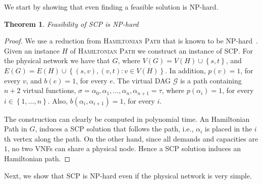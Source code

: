 \documentclass[11pt]{article}
\newtheorem{theorem}{Theorem}
\newcommand{\set}[1]{\left\{ #1 \right\}}
\newcommand{\scp}{\textsc{SCP}\xspace}
\newcommand{\calG}{\mathcal{G}}
\begin{document}
We start by showing that even finding a feasible solution is NP-hard.

\begin{theorem}
Feasibility of \scp is NP-hard
\end{theorem}
\begin{proof}
We use a reduction from \textsc{Hamiltonian Path} that is known to be
NP-hard~\cite{GarJoh79}.
%
Given an instance $H$ of \textsc{Hamiltonian Path} we construct an
instance of \scp.  For the physical network we have that $G$, where
$V(G) = V(H) \cup \set{s,t}$, and $E(G) = E(H) \cup \set{(s,v),(v,t) :
  v \in V(H)}$.  In addition, $p(v) = 1$, for every $v$, and $b(e) =
1$, for every $e$.  The virtual DAG $\calG$ is a path containing $n+2$
virtual functions, $\sigma = \alpha_0, \alpha_1, \ldots, \alpha_n,
\alpha_{n+1} = \tau$, where $p(\alpha_i) = 1$, for every $i \in
\set{1,\ldots,n}$.  Also, $b(\alpha_i,\alpha_{i+1}) = 1$, for every
$i$.

The construction can clearly be computed in polynomial time.
%
An Hamiltonian Path in $G$, induces a \scp solution that follows the
path, i.e., $\alpha_i$ is placed in the $i$th vertex along the path.
%
On the other hand, since all demands and capacities are $1$, no two
VNFs can share a physical node.  Hence a \scp solution induces an
Hamiltonian path.
\end{proof}

Next, we show that \scp is NP-hard even if the physical network is
very simple. 
\end{document}
